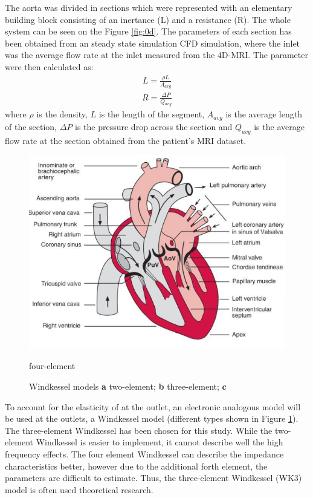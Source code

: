 The aorta was divided in sections which were represented with an elementary building block consisting of an inertance (L) and a resistance (R). The whole system can be seen on the Figure \ref{fig:0d}. The parameters of each section has been obtained from an steady state simulation CFD simulation, where the inlet was the average flow rate at the inlet measured from the 4D-MRI. The parameter were then calculated as:
\begin{align}
    L = \frac{\rho L}{A_{avg}}
\end{align}
\begin{align}
    R = \frac{\Delta P}{Q_{avg}}
\end{align}
where $\rho$ is the density, $L$ is the length of the segment, $A_{avg}$ is the average length of the section, $\Delta P$ is the pressure drop across the section and $Q_{avg}$ is the average flow rate at the section obtained from the patient's MRI dataset.\par

\begin{figure}[ht!]
  \centering
  \includegraphics[draft]{Figures/heart}
  \caption{Windkessel models \textbf{a} two-element; \textbf{b} three-element; \textbf{c}} four-element
  \label{fig:wind}
\end{figure}

To account for the elasticity of at the outlet, an electronic analogous model will be used at the outlets, a Windkessel model (different types shown in Figure \ref{fig:wind}). The three-element Windkessel has been chosen for this study. While the two-element Windkessel is easier to implement, it cannot describe well the high frequency effects. The four element Windkessel can describe the impedance characteristics better, however due to the additional forth element, the parameters are difficult to estimate. Thus, the three-element Windkessel (WK3) model is often used theoretical research. \par

